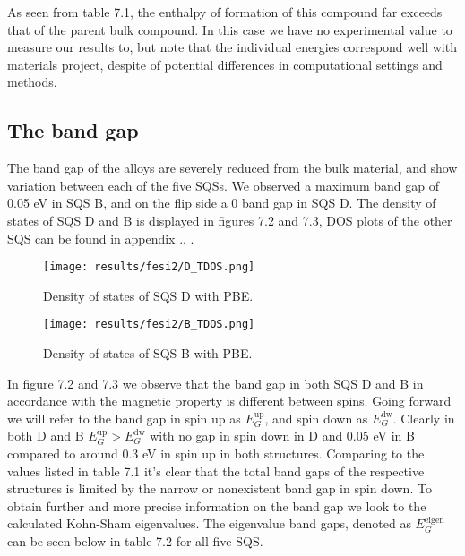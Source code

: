 As seen from table 7.1, the enthalpy of formation of this compound far exceeds that of the parent bulk compound. In this case we have no experimental value to measure our results to, but note that the individual energies correspond well with materials project, despite of potential differences in computational settings and methods. 

\newpage
\subsection{The band gap}
The band gap of the alloys are severely reduced from the bulk material, and show variation between each of the five SQSs. We observed a maximum band gap of 0.05 eV in SQS B, and on the flip side a 0 band gap in SQS D. The density of states of SQS D and B is displayed in figures 7.2 and 7.3, DOS plots of the other SQS can be found in appendix .. .

\begin{figure}[H]
	\centering
	\texttt{[image: results/fesi2/D\_TDOS.png]}
	\caption{Density of states of SQS D  with PBE.}
\end{figure}

\begin{figure}[H]
\centering
	\texttt{[image: results/fesi2/B\_TDOS.png]}
	\caption{Density of states of SQS B  with PBE.}
\end{figure}  

In figure 7.2  and 7.3 we observe that the band gap in both SQS D and B in accordance with the magnetic property is different between spins. Going forward we will refer to the band gap in spin up as $E_G ^\text{up}$, and spin down as $E_G ^\text{dw}$. Clearly in both D and B $E_G ^\text{up} > E_G ^\text{dw}$ with no gap in spin down in D and 0.05 eV in B compared to around 0.3 eV in spin up in both structures. Comparing to the values listed in table 7.1 it's clear that the total band gaps of the respective structures is limited by the narrow or nonexistent band gap in spin down. To obtain further and more precise information on the band gap we look to the calculated Kohn-Sham eigenvalues. The eigenvalue band gaps, denoted as $E_G ^\text{eigen}$ can be seen below in table 7.2 for all five SQS.   

